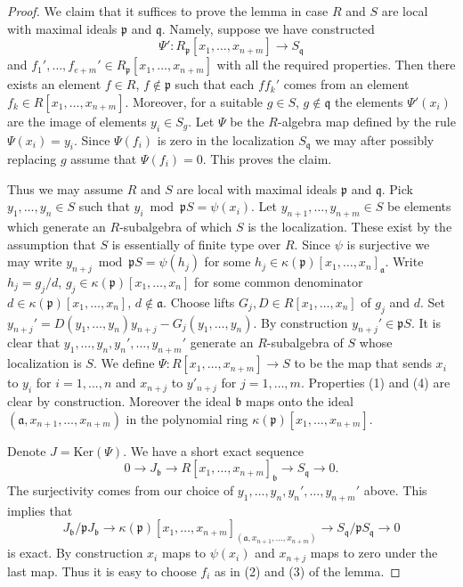 \begin{proof}
We claim that it suffices to prove the lemma in case $R$
and $S$ are local with maximal ideals $\mathfrak p$ and $\mathfrak q$.
Namely, suppose we have constructed
$$
\Psi' : R_{\mathfrak p}[x_1, \ldots, x_{n + m}]
\longrightarrow
S_{\mathfrak q}
$$
and $f_1', \ldots, f_{e + m}' \in R_{\mathfrak p}[x_1, \ldots, x_{n + m}]$
with all the required properties. Then there exists an element
$f \in R$, $f \not \in \mathfrak p$ such that each
$ff_k'$ comes from an element $f_k \in R[x_1, \ldots, x_{n + m}]$.
Moreover, for a suitable $g \in S$, $g \not \in \mathfrak q$
the elements $\Psi'(x_i)$ are the image of elements
$y_i \in S_g$. Let $\Psi$ be the $R$-algebra map defined
by the rule $\Psi(x_i) = y_i$. Since $\Psi(f_i)$ is zero
in the localization $S_{\mathfrak q}$ we may after possibly
replacing $g$ assume that $\Psi(f_i) = 0$. This proves the claim.

\medskip\noindent
Thus we may assume $R$ and $S$ are local
with maximal ideals $\mathfrak p$ and $\mathfrak q$.
Pick $y_1, \ldots, y_n \in S$ such that
$y_i \bmod \mathfrak pS = \psi(x_i)$.
Let $y_{n + 1}, \ldots, y_{n + m} \in S$ be elements which generate
an $R$-subalgebra of which $S$ is the localization.
These exist by the assumption that $S$ is essentially of
finite type over $R$. Since $\psi$ is surjective we
may write $y_{n + j} \bmod \mathfrak pS = \psi(h_j)$ for
some $h_j \in \kappa(\mathfrak p)[x_1, \ldots, x_n]_{\mathfrak a}$.
Write $h_j = g_j/d$, $g_j \in \kappa(\mathfrak p)[x_1, \ldots, x_n]$
for some common denominator $d \in \kappa(\mathfrak p)[x_1, \ldots, x_n]$,
$d \not \in \mathfrak a$. Choose lifts $G_j, D \in R[x_1, \ldots, x_n]$
of $g_j$ and $d$. Set
$y_{n + j}' = D(y_1, \ldots, y_n) y_{n + j} - G_j(y_1, \ldots, y_n)$.
By construction $y_{n + j}' \in \mathfrak p S$.
It is clear that $y_1, \ldots, y_n, y_n', \ldots, y_{n + m}'$
generate an $R$-subalgebra of $S$ whose localization is $S$.
We define $\Psi : R[x_1, \ldots, x_{n + m}] \to S$ to be
the map that sends $x_i$ to $y_i$ for $i = 1, \ldots, n$
and $x_{n + j}$ to $y'_{n + j}$ for $j = 1, \ldots, m$. Properties
(1) and (4) are clear by construction. Moreover the ideal
$\mathfrak b$ maps onto the ideal
$(\mathfrak a, x_{n + 1}, \ldots, x_{n + m})$
in the polynomial ring $\kappa(\mathfrak p)[x_1, \ldots, x_{n + m}]$.

\medskip\noindent
Denote $J = \text{Ker}(\Psi)$. We have a short exact sequence
$$
0 \to J_{\mathfrak b}
\to R[x_1, \ldots, x_{n + m}]_{\mathfrak b}
\to S_{\mathfrak q} 
\to 0.
$$
The surjectivity comes from our choice of 
$y_1, \ldots, y_n, y_n', \ldots, y_{n + m}'$ above.
This implies that
$$
J_{\mathfrak b}/ \mathfrak pJ_{\mathfrak b}
\to \kappa(\mathfrak p)[x_1, \ldots, x_{n + m}]_{
(\mathfrak a, x_{n + 1}, \ldots, x_{n + m})}
\to S_{\mathfrak q}/\mathfrak pS_{\mathfrak q} 
\to 0
$$
is exact. By construction $x_i$ maps to $\psi(x_i)$ and
$x_{n + j}$ maps to zero under the last map.
Thus it is easy to choose $f_i$ as in
(2) and (3) of the lemma.
\end{proof}

